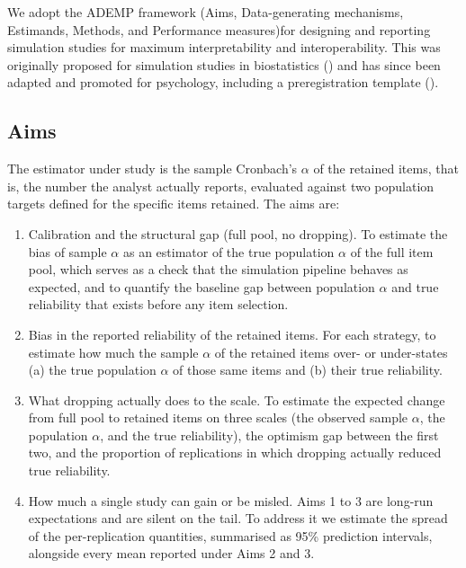 \documentclass[
  nonatbib,
  authoryear,
  preprint]{elsarticle}
\providecommand{\tightlist}{%
  \setlength{\itemsep}{0pt}\setlength{\parskip}{0pt}}
\begin{document}
We adopt the ADEMP framework (Aims, Data-generating mechanisms,
Estimands, Methods, and Performance measures)for designing and reporting
simulation studies for maximum interpretability and interoperability.
This was originally proposed for simulation studies in biostatistics
() and has since
been adapted and promoted for psychology, including a preregistration
template ().

\subsection{Aims}\label{aims}

The estimator under study is the sample Cronbach's \(\alpha\) of the
retained items, that is, the number the analyst actually reports,
evaluated against two population targets defined for the specific items
retained. The aims are:

\begin{enumerate}
\def\labelenumi{\arabic{enumi}.}
\tightlist
\item
  Calibration and the structural gap (full pool, no dropping). To
  estimate the bias of sample \(\alpha\) as an estimator of the true
  population \(\alpha\) of the full item pool, which serves as a check
  that the simulation pipeline behaves as expected, and to quantify the
  baseline gap between population \(\alpha\) and true reliability that
  exists before any item selection.
\item
  Bias in the reported reliability of the retained items. For each
  strategy, to estimate how much the sample \(\alpha\) of the retained
  items over- or under-states (a) the true population \(\alpha\) of
  those same items and (b) their true reliability.
\item
  What dropping actually does to the scale. To estimate the expected
  change from full pool to retained items on three scales (the observed
  sample \(\alpha\), the population \(\alpha\), and the true
  reliability), the optimism gap between the first two, and the
  proportion of replications in which dropping actually reduced true
  reliability.
\item
  How much a single study can gain or be misled. Aims 1 to 3 are
  long-run expectations and are silent on the tail. To address it we
  estimate the spread of the per-replication quantities, summarised as
  95\% prediction intervals, alongside every mean reported under Aims 2
  and 3.
\end{enumerate}
\end{document}
